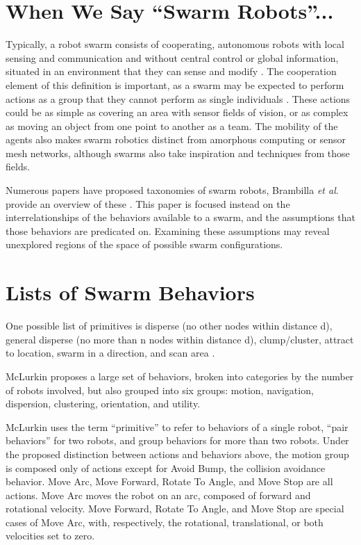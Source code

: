 \documentclass[]{article}
\begin{document}
\section{When We Say ``Swarm Robots''...}

Typically, a robot swarm consists of cooperating, autonomous robots with local sensing and communication and without central control or global information, situated in an environment that they can sense and modify \cite{brambilla2013swarm}.
The cooperation element of this definition is important, as a swarm may be expected to perform actions as a group that they cannot perform as single individuals \cite{csahin2004swarm}. 
These actions could be as simple as covering an area with sensor fields of vision, or as complex as moving an object from one point to another as a team. 
The mobility of the agents also makes swarm robotics distinct from amorphous computing or sensor mesh networks, although swarms also take inspiration and techniques from those fields.  

Numerous papers have proposed taxonomies of swarm robots, Brambilla \textit{et al}. provide an overview of these \cite{brambilla2013swarm}. 
This paper is focused instead on the interrelationships of the behaviors available to a swarm, and the assumptions that those behaviors are predicated on. 
Examining these assumptions may reveal unexplored regions of the space of possible swarm configurations. 


\section{Lists of Swarm Behaviors}

One possible list of primitives is disperse (no other nodes within distance d), general disperse (no more than n nodes within distance d), clump/cluster, attract to location, swarm in a direction, and scan area \cite{evans2000programming}.

McLurkin proposes a large set of behaviors, broken into categories by the number of robots involved, but also grouped into six groups: motion, navigation, dispersion, clustering, orientation, and utility.

McLurkin uses the term ``primitive'' to refer to behaviors of a single robot, ``pair behaviors'' for two robots, and group behaviors for more than two robots. 
Under the proposed distinction between actions and behaviors above, the motion group is composed only of actions except for Avoid Bump, the collision avoidance behavior. Move Arc, Move Forward, Rotate To Angle, and Move Stop are all actions. 
Move Arc moves the robot on an arc, composed of forward and rotational velocity. Move Forward, Rotate To Angle, and Move Stop are special cases of Move Arc, with, respectively, the rotational, translational, or both velocities set to zero. 
 
\end{document}
